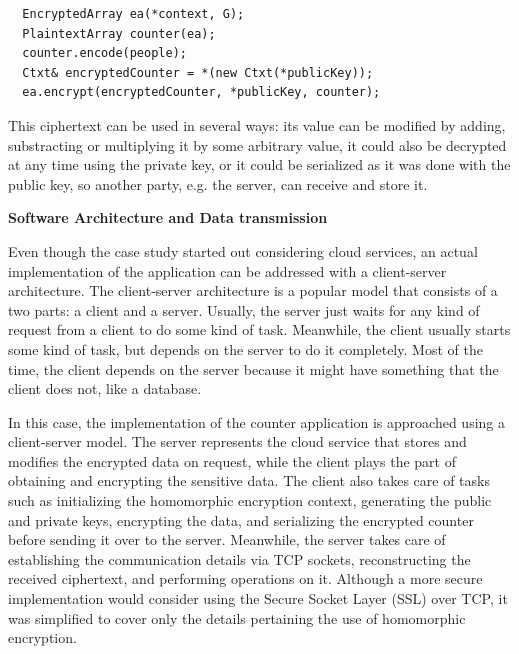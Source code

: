 \begin{lstlisting}
  EncryptedArray ea(*context, G);
  PlaintextArray counter(ea);  
  counter.encode(people);
  Ctxt& encryptedCounter = *(new Ctxt(*publicKey));  
  ea.encrypt(encryptedCounter, *publicKey, counter); 
\end{lstlisting}

This ciphertext can be used in several ways: its value can be modified by adding, substracting or multiplying it by some arbitrary value, it could also be decrypted at any time using the private key, or it could be serialized as it was done with the public key, so another party, e.g. the server, can receive and store it.

\textbf{Software Architecture and Data transmission}

Even though the case study started out considering cloud services, an actual implementation of the application can be addressed with a client-server architecture. The client-server architecture is a popular model that consists of a two parts: a client and a server. Usually, the server just waits for any kind of request from a client to do some kind of task. Meanwhile, the client usually starts some kind of task, but depends on the server to do it completely. Most of the time, the client depends on the server because it might have something that the client does not, like a database.

In this case, the implementation of the counter application is approached using a client-server model. The server represents the cloud service that stores and modifies the encrypted data on request, while the client plays the part of obtaining and encrypting the sensitive data. The client also takes care of tasks such as initializing the homomorphic encryption context, generating the public and private keys, encrypting the data, and serializing the encrypted counter before sending it over to the server. Meanwhile, the server takes care of establishing the communication details via TCP sockets, reconstructing the received ciphertext, and performing operations on it. Although a more secure implementation would consider using the Secure Socket Layer (SSL) over TCP, it was simplified to cover only the details pertaining the use of homomorphic encryption.

